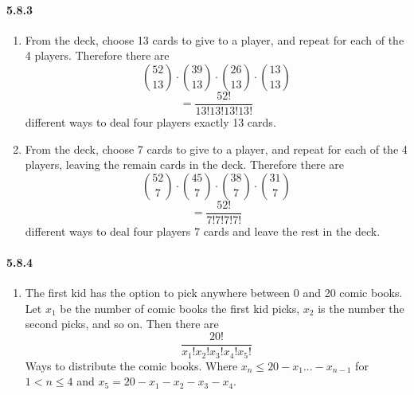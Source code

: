 \documentclass[11pt, letterpaper, twocolumn, fleqn]{article}
\begin{document}
\paragraph{5.8.3}
\begin{enumerate}
  \item From the deck, choose 13 cards to give to a player, and repeat for each of the 4 players. Therefore there are 
    $$\binom{52}{13} \cdot \binom{39}{13} \cdot \binom{26}{13} \cdot \binom{13}{13}$$
    $$= \frac{52!}{13!13!13!13!}$$
  different ways to deal four players exactly 13 cards.
  \item From the deck, choose 7 cards to give to a player, and repeat for each of the 4 players, leaving the remain cards in the deck. Therefore there are 
    $$\binom{52}{7} \cdot \binom{45}{7} \cdot \binom{38}{7} \cdot \binom{31}{7}$$
    $$= \frac{52!}{7!7!7!7!}$$
  different ways to deal four players 7 cards and leave the rest in the deck.
\end{enumerate}

\paragraph{5.8.4}
\begin{enumerate}
  \item The first kid has the option to pick anywhere between 0 and 20 comic books. Let $x_1$ be the number of comic books the first kid picks, $x_2$ is the number the second picks, and so on. Then there are 
    $$ \frac{20!}{x_1!x_2!x_3!x_4!x_5!} $$
  Ways to distribute the comic books. Where $x_n \leq 20 - x_1...-x_{n-1}$ for $1 < n \leq 4$ and $x_5 = 20-x_1-x_2-x_3-x_4$.
\end{enumerate}
\end{document}
